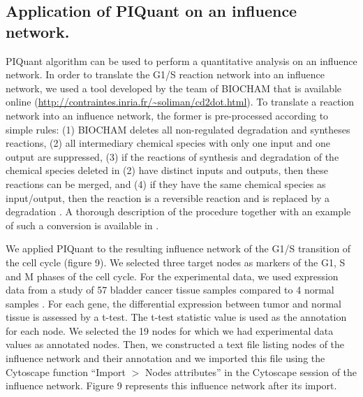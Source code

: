 \documentclass[10pt]{bmc_article}
\newenvironment{bmcformat}{\baselineskip20pt\sloppy\setboolean{publ}{false}}{\baselineskip20pt\sloppy}
\begin{document}
\begin{bmcformat}
\subsection*{Application of PIQuant on an influence network.}
PIQuant algorithm can be used to perform a quantitative analysis on an influence
network. In order to translate the G1/S reaction network into an influence network, we used
a tool developed by the team of BIOCHAM \cite{calzone2006biocham} that is
available online (\url{http://contraintes.inria.fr/~soliman/cd2dot.html}). To
translate a reaction network into an influence network, the former is 
pre-processed according to simple rules: (1) BIOCHAM deletes all non-regulated
degradation and syntheses reactions, (2) all intermediary chemical species with
only one input and
one output are suppressed, (3) if the reactions of synthesis and degradation of
the chemical species deleted in (2) have distinct inputs and outputs, then these
reactions
can be merged, and (4) if they have the same chemical species as input/output,
then the reaction is a
reversible reaction and is replaced by a degradation \cite{fages2008frontiers}.
A thorough description of the procedure together with an example of such a
conversion is
available in \cite{calzone2011calamar}.

We applied PIQuant to the resulting influence network of the G1/S transition of
the cell cycle (figure 9). We selected three target nodes as
markers of the G1, S and M
phases of the cell cycle. For the experimental data, we used expression data
from a study of 57 bladder cancer
tissue samples compared to 4 normal samples \cite{stransky2006regional}. For
each gene, the differential expression between tumor and normal tissue
is assessed by a t-test. The t-test statistic value is used as the annotation
for each node. We selected the 19 nodes for which we had experimental data
values as annotated nodes. Then, we constructed a text file listing nodes of the influence network
and their annotation and we imported this file using the Cytoscape function
``Import $>$ Nodes attributes''
in the Cytoscape session of the influence network.
Figure 9 represents this influence network after its import.



\end{bmcformat}
\end{document}
